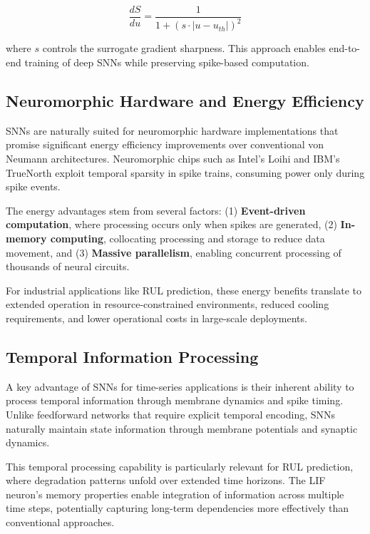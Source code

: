 \documentclass[11pt]{article}
\begin{document}
\begin{equation}
\frac{dS}{du} = \frac{1}{1 + (s \cdot |u - u_{th}|)^2}
\end{equation}

where $s$ controls the surrogate gradient sharpness. This approach enables end-to-end training of deep SNNs while preserving spike-based computation.

\subsection{Neuromorphic Hardware and Energy Efficiency}

SNNs are naturally suited for neuromorphic hardware implementations that promise significant energy efficiency improvements over conventional von Neumann architectures. Neuromorphic chips such as Intel's Loihi and IBM's TrueNorth exploit temporal sparsity in spike trains, consuming power only during spike events.

The energy advantages stem from several factors: (1) \textbf{Event-driven computation}, where processing occurs only when spikes are generated, (2) \textbf{In-memory computing}, collocating processing and storage to reduce data movement, and (3) \textbf{Massive parallelism}, enabling concurrent processing of thousands of neural circuits.

For industrial applications like RUL prediction, these energy benefits translate to extended operation in resource-constrained environments, reduced cooling requirements, and lower operational costs in large-scale deployments.

\subsection{Temporal Information Processing}

A key advantage of SNNs for time-series applications is their inherent ability to process temporal information through membrane dynamics and spike timing. Unlike feedforward networks that require explicit temporal encoding, SNNs naturally maintain state information through membrane potentials and synaptic dynamics.

This temporal processing capability is particularly relevant for RUL prediction, where degradation patterns unfold over extended time horizons. The LIF neuron's memory properties enable integration of information across multiple time steps, potentially capturing long-term dependencies more effectively than conventional approaches.
\end{document}
